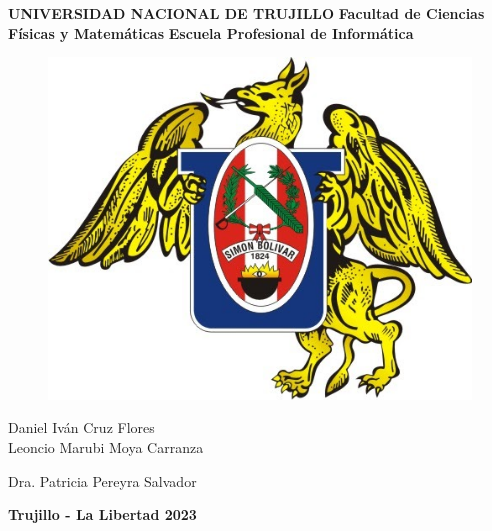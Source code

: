 \documentclass[a4paper, 12pt]{article}
\begin{document}
\begin{center}
 {\bf {\fontsize{16}{16.8}\selectfont UNIVERSIDAD NACIONAL DE TRUJILLO}}     
 \vskip 0.15cm
    {\bf{\fontsize{16}{16.8}\selectfont Facultad de Ciencias Físicas y Matemáticas}} 
\vskip 0.15cm
  {\bf{\fontsize{16}{16.8}\selectfont Escuela Profesional de Informática}}
\end{center}  

\begin{figure}[ht]
\begin{center}
\includegraphics[width=.3\textwidth]{unt}
\end{center}
\end{figure}

\vskip 2cm

\begin{center}
  { \bf {\fontsize{17}{20.4} \selectfont{ Desarrollo de un sistema BMS – IoT y su influencia en el \\ 
  \vskip 0.2cm control automatizado del consumo eléctrico basado en el\\
  \vskip 0.2cm protocolo MQTT en viviendas multifamiliares,\\
  \vskip 0.2cm Trujillo 2023.}}  } 

 
  \vskip 2cm
  { \bf {\fontsize{17}{20.4}}  }
  
 \vskip 0.25cm 
  
   Daniel Iván Cruz Flores \\
   Leoncio Marubi Moya Carranza
 
	   
  \vskip 1cm
  { \bf {\fontsize{17}{20.4} }  } 
 \vskip 0.25cm 
 
   Dra. Patricia Pereyra Salvador
  
\vskip 2cm


{\bf {\fontsize{14}{16.8}\selectfont Trujillo - La Libertad
\vskip 0.0cm
\hspace*{-0.2cm} 
\vskip 0.1cm
2023 }}
\end{center} 
\newpage
\end{document}
